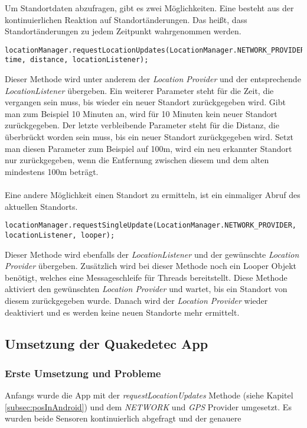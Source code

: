 Um Standortdaten abzufragen, gibt es zwei Möglichkeiten. 
Eine besteht aus der kontinuierlichen Reaktion auf Standortänderungen. Das heißt, dass Standortänderungen zu jedem Zeitpunkt wahrgenommen werden.

\begin{lstlisting}[caption={requestLocationUpdates},label=lst:requestLocationUpdates, basicstyle=\small]
locationManager.requestLocationUpdates(LocationManager.NETWORK_PROVIDER, time, distance, locationListener);
\end{lstlisting}

Dieser Methode wird unter anderem der \textit{Location Provider} und der entsprechende \textit{LocationListener} übergeben. Ein weiterer Parameter steht für die Zeit, die vergangen sein muss, bis wieder ein neuer Standort zurückgegeben wird. Gibt man zum Beispiel 10 Minuten an, wird für 10 Minuten kein neuer Standort zurückgegeben. 
Der letzte verbleibende Parameter steht für die Distanz, die überbrückt worden sein muss, bis ein neuer Standort zurückgegeben wird. Setzt man diesen Parameter zum Beispiel auf 100m, wird ein neu erkannter Standort nur zurückgegeben, wenn die Entfernung zwischen diesem und dem alten mindestens 100m beträgt. 
\\
\\
Eine andere Möglichkeit einen Standort zu ermitteln, ist ein einmaliger Abruf des aktuellen Standorts.
\begin{lstlisting}[caption={requestSingleUpdate},label=lst:requestSingleUpdate, basicstyle=\small]
locationManager.requestSingleUpdate(LocationManager.NETWORK_PROVIDER, locationListener, looper);
\end{lstlisting}

Dieser Methode wird ebenfalls der \textit{LocationListener} und der gewünschte \textit{Location Provider} übergeben. Zusätzlich wird bei dieser Methode noch ein Looper Objekt benötigt, welches eine Messageschleife für Threads bereitstellt.
Diese Methode aktiviert den gewünschten \textit{Location Provider} und wartet, bis ein Standort von diesem zurückgegeben wurde. Danach wird der \textit{Location Provider} wieder deaktiviert und es werden keine neuen Standorte mehr ermittelt.

\subsection{Umsetzung der Quakedetec App}
\subsubsection{Erste Umsetzung und Probleme}
Anfangs wurde die App mit der \textit{requestLocationUpdates} Methode (siehe Kapitel \ref{subsec:posInAndroid}) und dem \textit{NETWORK} und \textit{GPS} Provider umgesetzt. Es wurden beide Sensoren kontinuierlich abgefragt und der genauere

